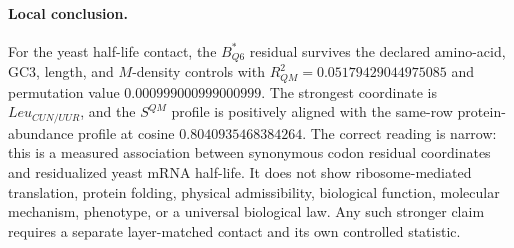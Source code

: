 \paragraph{Local conclusion.}
For the yeast half-life contact, the $B^{\ast}_{Q6}$ residual survives the declared amino-acid, GC3, length, and $M$-density controls with $R^2_{QM}=0.05179429044975085$ and permutation value $0.000999000999000999$.  The strongest coordinate is $Leu_{CUN/UUR}$, and the $S^{QM}$ profile is positively aligned with the same-row protein-abundance profile at cosine $0.8040935468384264$.  The correct reading is narrow: this is a measured association between synonymous codon residual coordinates and residualized yeast mRNA half-life.  It does not show ribosome-mediated translation, protein folding, physical admissibility, biological function, molecular mechanism, phenotype, or a universal biological law.  Any such stronger claim requires a separate layer-matched contact and its own controlled statistic.